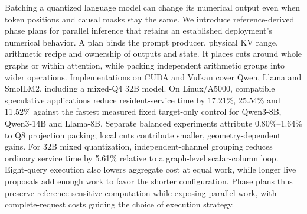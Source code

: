 Batching a quantized language model can change its numerical output even when token positions and causal masks stay the same. We introduce reference-derived phase plans for parallel inference that retains an established deployment's numerical behavior. A plan binds the prompt producer, physical KV range, arithmetic recipe and ownership of outputs and state. It places cuts around whole graphs or within attention, while packing independent arithmetic groups into wider operations. Implementations on CUDA and Vulkan cover Qwen, Llama and SmolLM2, including a mixed-Q4 32B model. On Linux/A5000, compatible speculative applications reduce resident-service time by 17.21\%, 25.54\% and 11.52\% against the fastest measured fixed target-only control for Qwen3-8B, Qwen3-14B and Llama-8B. Separate balanced experiments attribute 0.80\%--1.64\% to Q8 projection packing; local cuts contribute smaller, geometry-dependent gains. For 32B mixed quantization, independent-channel grouping reduces ordinary service time by 5.61\% relative to a graph-level scalar-column loop. Eight-query execution also lowers aggregate cost at equal work, while longer live proposals add enough work to favor the shorter configuration. Phase plans thus preserve reference-sensitive computation while exposing parallel work, with complete-request costs guiding the choice of execution strategy.
